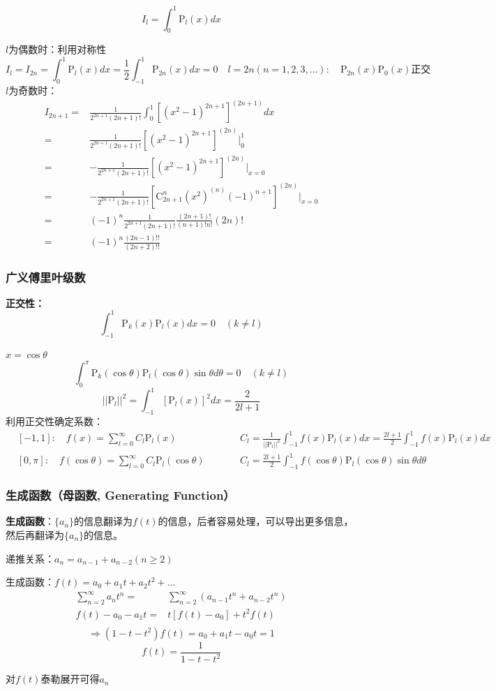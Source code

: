 \begin{ex}
    $$I_l=\int_0^1\mathrm{P}_l(x)dx$$

\noindent $l$为偶数时：利用对称性
    $$I_l=I_{2n}=\int_0^1\mathrm{P}_l(x)dx=\frac{1}{2}\int_{-1}^1\mathrm{P}_{2n}(x)dx=0 \quad l=2n(n=1,2,3,\dots):\quad \mathrm{P}_{2n}(x)\mathrm{P}_0(x)\mbox{正交}$$
\noindent $l$为奇数时：
    $$\begin{aligned}
    I_{2n+1}
    =&\frac{1}{2^{2n+1}(2n+1)!}\int_{0}^1[(x^2-1)^{2n+1}]^{(2n+1)}dx\\
    =&\frac{1}{2^{2n+1}(2n+1)!}[(x^2-1)^{2n+1}]^{(2n)}\bigg|_0^1\\
    =&-\frac{1}{2^{2n+1}(2n+1)!}[(x^2-1)^{2n+1}]^{(2n)}\bigg|_{x=0}\\
    =&-\frac{1}{2^{2n+1}(2n+1)!}[\mathrm{C}_{2n+1}^n(x^2)^{(n)}(-1)^{n+1}]^{(2n)}\bigg|_{x=0}\\
    =&(-1)^n\frac{1}{2^{2n+1}(2n+1)!}\frac{(2n+1)!}{(n+1)!n!}(2n)!\\
    =&\boxed{(-1)^n\frac{(2n-1)!!}{(2n+2)!!}}
    \end{aligned}$$
\end{ex}

\subsubsection{广义傅里叶级数}
\noindent \textbf{正交性：}
$$\int_{-1}^1\mathrm{P}_k(x)\mathrm{P}_l(x)dx=0\quad(k\ne l)$$

$x=\cos\theta$
$$\int_0^{\pi}\mathrm{P}_k(\cos\theta)\mathrm{P}_l(\cos\theta)\sin\theta d\theta=0\quad(k\ne l)$$
$$\boxed{||\mathrm{P}_l||^2=\int_{-1}^1[\mathrm{P}_l(x)]^2dx=\frac{2}{2l+1}}$$
利用正交性确定系数：
$$
\begin{aligned}
&[-1,1]:\quad f(x)=\sum_{l=0}^\infty C_l\mathrm{P}_l(x)\qquad &&C_l=\frac{1}{||\mathrm{P}_l||^2}\int_{-1}^1f(x)\mathrm{P}_l(x)dx=\frac{2l+1}{2}\int_{-1}^1f(x)\mathrm{P}_l(x)dx\\
&[0,\pi]:\quad f(\cos\theta)=\sum_{l=0}^\infty C_l\mathrm{P}_l(\cos\theta)\qquad&&C_l=\frac{2l+1}{2}\int_{-1}^1f(\cos\theta)\mathrm{P}_l(\cos\theta)\sin\theta d\theta
\end{aligned}$$


\subsubsection{生成函数（母函数, Generating Function）}
\textbf{生成函数}：$\{a_n\}$的信息翻译为$f(t)$的信息，后者容易处理，可以导出更多信息，然后再翻译为$\{a_n\}$的信息。
\begin{ex}[斐波那契数列的通项公式]递推关系：$a_n=a_{n-1}+a_{n-2}(n\ge2)$

生成函数：$f(t)=a_0+a_1t+a_2t^2+\dots$
$$\begin{aligned}
\sum_{n=2}^\infty a_nt^n=&\sum_{n=2}^\infty(a_{n-1}t^n+a_{n-2}t^n)\\
f(t)-a_0-a_1t=&t[f(t)-a_0]+t^2f(t)\\
\end{aligned}$$
$$\Rightarrow(1-t-t^2)f(t)=a_0+a_1t-a_0t=1$$
$$f(t)=\frac{1}{1-t-t^2}$$

对$f(t)$泰勒展开可得$a_n$
\end{ex}

